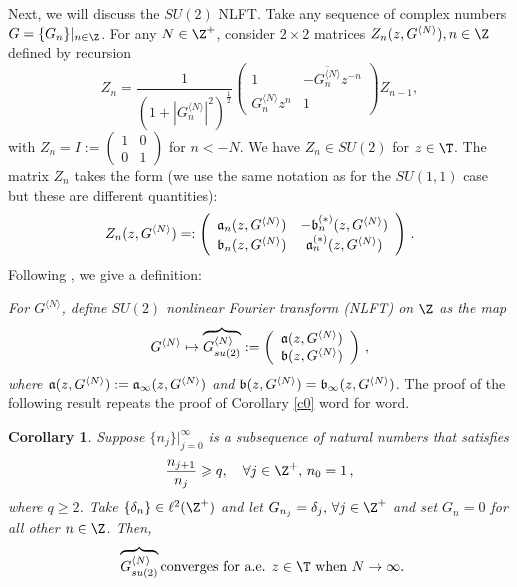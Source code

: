\documentclass[twoside,a4paper]{amsart}
\def\ge{\geqslant}
\newtheorem{corollary}[theorem]{Corollary}
\theoremstyle{remark}
\numberwithin{equation}{section}
\begin{document}
 Next, we will discuss the $SU(2)$ NLFT. Take any sequence of complex numbers $G=\{G_n\}|_{n\in \Z}$. For any $N\in \Z^+$, consider $2\times 2$ matrices $Z_n(z,G^{\langle N\rangle}), n\in \Z$ defined by recursion
\begin{equation}\label{rec6}
 Z_n= \frac{1}{(1+|G_n^{\langle N\rangle}|^2)^{\frac 12}}
\left(\begin{array}{cc}
1& -\overline{G_n^{\langle N\rangle}}z^{-n}\\
G_n^{\langle N\rangle} z^n &1
\end{array}\right)Z_{n-1}, 
\end{equation}
with $Z_n=I:=\left(\begin{smallmatrix}1&0\\0&1
\end{smallmatrix}
\right)$ for $n< -N$. We have $Z_n\in SU(2)$ for $z\in \T$. The matrix $Z_n$ takes the form (we use the same notation as for the $SU(1,1)$ case but these are different quantities):
\[
Z_n(z,G^{\langle N\rangle})=:\left(\begin{array}{cc}
\frak{a}_n(z,G^{\langle N\rangle})& -\frak{b}^{(*)}_n(z,G^{\langle N\rangle})\\
\frak{b}_n(z,G^{\langle N\rangle}) &\frak{a}^{(*)}_n(z,G^{\langle N\rangle})
\end{array}\right)\,.
\]
Following \cite{AMT24,gev,amt}, we give a definition: \smallskip

 {\it For $G^{\langle N\rangle}$, define $SU(2)$ nonlinear Fourier transform (NLFT) on $\Z$ as the map 
\[
G^{\langle N\rangle}\mapsto \overbrace{G_{su(2)}^{\langle N\rangle}}:=\left(\begin{array}{c}
\frak{a}(z,G^{\langle N\rangle})\\
\frak{b}(z,G^{\langle N\rangle}) 
\end{array}\right)\,,
\]
where $\frak{a}(z,G^{\langle N\rangle}):=\frak{a}_\infty(z,G^{\langle N\rangle})$ and 
$\frak{b}(z,G^{\langle N\rangle})=\frak{b}_\infty(z,G^{\langle N\rangle})$.}
\smallskip
The proof of the following result repeats the proof of Corollary \ref{c0} word for word.
\begin{corollary}\label{t6}Suppose $\{n_j\}|_{j=0}^\infty$ is a subsequence of natural numbers that satisfies 
\begin{equation}\label{spar5}
\frac{n_{j+1}}{n_j}\ge q, \quad \forall j\in \Z^+, \, n_0=1\,,
\end{equation}
where $q\ge 2$. Take $\{\delta_n\}\in \ell^2(\Z^+)$ and let $G_{n_j}=\delta_j, \, \forall j\in \Z^+$ and set $G_n=0$ for all other $n\in \Z$. Then,
\[
 \,\,\overbrace{G_{su(2)}^{\langle N\rangle}}
\text{converges for a.e. $z\in \T$ when $N\to\infty$.}
\]
\end{corollary}\bigskip
\end{document}
